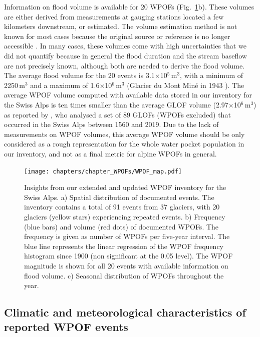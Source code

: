 Information on flood volume is available for 20 WPOFs (Fig.~\ref{fig:WPOFs_map}b). These volumes are either derived from measurements at gauging stations located a few kilometers downstream, or estimated. The volume estimation method is not known for most cases because the original source or reference is no longer accessible \cite[cf.][]{Haeberli1983}. In many cases, these volumes come with high uncertainties that we did not quantify because in general the flood duration and the stream baseflow are not precisely known, although both are needed to derive the flood volume. The average flood volume for the 20 events is 3.1$\times$10$^5$\,m$^3$, with a minimum of 2250\,m$^3$ and a maximum of 1.6$\times$10$^6$\,m$^3$ (Glacier du Mont Miné in 1943 \citep{Bohorquez&Darby2008}). The average WPOF volume computed with available data stored in our inventory for the Swiss Alps is ten times smaller than the average GLOF volume (2.97$\times$10$^6$\,m$^3$) as reported by \cite{Veh&al2022}, who analysed a set of 89 GLOFs (WPOFs excluded) that occurred in the Swiss Alps between 1560 and 2019. Due to the lack of measurements on WPOF volumes, this average WPOF volume should be only considered as a rough representation for the whole water pocket population in our inventory, and not as a final metric for alpine WPOFs in general.

\begin{figure}
    \centering
    \texttt{[image: chapters/chapter\_WPOFs/WPOF\_map.pdf]}
    \caption{Insights from our extended and updated WPOF inventory for the Swiss Alps. a) Spatial distribution of documented events. The inventory contains a total of 91 events from 37 glaciers, with 20 glaciers (yellow stars) experiencing repeated events. b) Frequency (blue bars) and volume (red dots) of documented WPOFs. The frequency is given as number of WPOFs per five-year interval. The blue line represents the linear regression of the WPOF frequency histogram since 1900 (non significant at the 0.05 level). The WPOF magnitude is shown for all 20 events with available information on flood volume. c) Seasonal distribution of WPOFs throughout the year.}
    \label{fig:WPOFs_map}
\end{figure}


\subsection{ Climatic and meteorological characteristics of reported WPOF events}
\label{sec:envelop_meteo}

